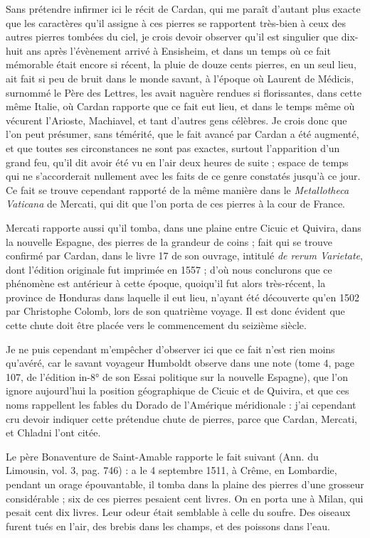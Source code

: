 \documentclass[a4paper, 12pt, oneside, french]{article}
\begin{document}
Sans prétendre infirmer ici le récit de Cardan, qui me paraît d'autant plus exacte que les caractères qu'il assigne à ces pierres se rapportent très-bien à ceux des autres pierres tombées du ciel, je crois devoir observer qu'il est singulier que dix-huit ans après l'évènement arrivé à Ensisheim, et dans un temps où ce fait mémorable était encore si récent, la pluie de douze cents pierres, en un seul lieu, ait fait si peu de bruit dans le monde savant, à l'époque où Laurent de Médicis, surnommé le Père des Lettres, les avait naguère rendues si florissantes, dans cette même Italie, où Cardan rapporte que ce fait eut lieu, et dans le temps même où vécurent l'Arioste, Machiavel, et tant d'autres gens célèbres. Je crois donc que l'on peut présumer, sans témérité, que le fait avancé par Cardan a été augmenté, et que toutes ses circonstances ne sont pas exactes, surtout l'apparition d'un grand feu, qu'il dit avoir été vu en l'air deux heures de suite ; espace de temps qui ne s'accorderait nullement avec les faits de ce genre constatés jusqu'à ce jour. Ce fait se trouve cependant rapporté de la même manière dans le \emph{Metallotheca Vaticana} de Mercati, qui dit que l'on porta de ces pierres à la cour de France.

Mercati rapporte aussi qu'il tomba, dans une plaine entre Cicuic et Quivira, dans la nouvelle Espagne, des pierres de la grandeur de coins ; fait qui se trouve confirmé par Cardan, dans le livre 17 de son ouvrage, intitulé \emph{de rerum Varietate}, dont l'édition originale fut imprimée en 1557 ; d'où nous conclurons que ce phénomène est antérieur à cette époque, quoiqu'il fut alors très-récent, la province de Honduras dans laquelle il eut lieu, n'ayant été découverte qu'en 1502 par Christophe Colomb, lors de son quatrième voyage. Il est donc évident que cette chute doit être placée vers le commencement du seizième siècle.

Je ne puis cependant m'empêcher d'observer ici que ce fait n'est rien moins qu'avéré, car le savant voyageur Humboldt observe dans une note (tome 4, page 107, de l'édition in-8° de son Essai politique sur la nouvelle Espagne), que l'on ignore aujourd'hui la position géographique de Cicuic et de Quivira, et que ces noms rappellent les fables du Dorado de l'Amérique méridionale : j'ai cependant cru devoir indiquer cette prétendue chute de pierres, parce que Cardan, Mercati, et Chladni l'ont citée.

Le père Bonaventure de Saint-Amable rapporte le fait suivant (Ann. du Limousin, vol. 3, pag. 746) : \og a le 4 septembre 1511, à Crême, en Lombardie, pendant un orage épouvantable, il tomba dans la plaine des pierres d'une grosseur considérable ; six de ces pierres pesaient cent livres. On en porta une à Milan, qui pesait cent dix livres. Leur odeur était semblable à celle du soufre. Des oiseaux furent tués en l'air, des brebis dans les champs, et des poissons dans l'eau. \fg
\end{document}
